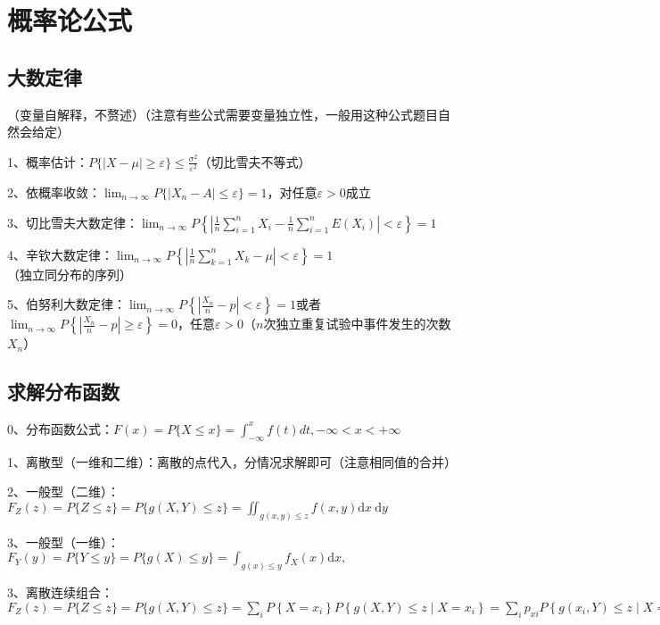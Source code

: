 \chapter{概率论公式}

\section{大数定律}

（变量自解释，不赘述）（注意有些公式需要变量独立性，一般用这种公式题目自然会给定）

1、概率估计：$ P\{|X-\mu| \geqslant \varepsilon\} \leqslant \frac{\sigma^{2}}{\varepsilon^{2}} $（切比雪夫不等式）

2、依概率收敛：$ \lim_{n \rightarrow \infty} P\{|X_n-A| \le \varepsilon \}=1 $，对任意$ \varepsilon > 0 $成立

3、切比雪夫大数定律：$ \lim_{n \rightarrow \infty} P\left\{\left|\frac{1}{n} \sum_{i=1}^{n} X_{i}-\frac{1}{n} \sum_{i=1}^{n} E\left(X_{i}\right)\right|<\varepsilon\right\}=1 $

4、辛钦大数定律：$ \lim_{n \rightarrow \infty} P\left\{\left|\frac{1}{n} \sum_{k=1}^{n} X_{k}-\mu\right|<\varepsilon\right\}=1 $（独立同分布的序列）

5、伯努利大数定律：$ \lim_{n \rightarrow \infty} P\left\{\left|\frac{X_n}{n}-p\right|<\varepsilon\right\}=1 $或者$ \lim_{n \rightarrow \infty} P\left\{\left|\frac{X_n}{n}-p\right| \geqslant \varepsilon\right\}=0 $，任意$ \varepsilon>0 $（$ n $次独立重复试验中事件发生的次数$ X_n $）

\section{求解分布函数}

0、分布函数公式：$ F(x) = P\{ X \le x\}=\int_{-\infty}^xf(t)dt,-\infty <x<+\infty $

1、离散型（一维和二维）：离散的点代入，分情况求解即可（注意相同值的合并）

2、一般型（二维）：$ F_{Z}(z)=P\{Z \leqslant z\}=P\{g(X, Y) \leqslant z\}=\iint_{g(x, y) \leqslant z} f(x, y) \mathrm{d} x \mathrm{~d} y $

3、一般型（一维）：$ F_{Y}(y)=P\{Y \leqslant y\}=P\{g(X) \leqslant y\}=\int_{g(x) \leqslant y} f_{X}(x) \mathrm{d} x,  $

3、离散连续组合：$ F_{Z}(z)=P\{Z \leqslant z\}=P\{g(X, Y) \leqslant z\} =\sum_{i} P\left\{X=x_{i}\right\} P\left\{g(X, Y) \leqslant z \mid X=x_{i}\right\}=\sum_{i} p_{xi} P\left\{g\left(x_{i}, Y\right) \leqslant z \mid X=x_{i}\right\} $

